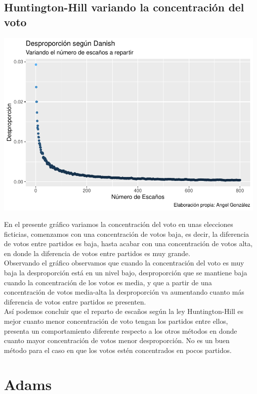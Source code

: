 \documentclass[12pt,a4paper,]{book}
\numberwithin{dummy}{section}
\theoremstyle{ocrenumbox}
\theoremstyle{blacknumex}
\theoremstyle{blacknumbox}
\theoremstyle{ocrenum}
\theoremstyle{ocrenum}
\begin{document}
\hypertarget{huntington-hill-variando-la-concentraciuxf3n-del-voto}{%
\subsection{Huntington-Hill variando la concentración del
voto}\label{huntington-hill-variando-la-concentraciuxf3n-del-voto}}

\begin{center}\includegraphics[width=0.95\linewidth]{figurasR/unnamed-chunk-35-1} \end{center}

En el presente gráfico variamos la concentración del voto en unas
elecciones ficticias, comenzamos con una concentración de votos baja, es
decir, la diferencia de votos entre partidos es baja, hasta acabar con
una concentración de votos alta, en donde la diferencia de votos entre
partidos es muy grande.\\
Observando el gráfico observamos que cuando la concentración del voto es
muy baja la desproporción está en un nivel bajo, desproporción que se
mantiene baja cuando la concentración de los votos es media, y que a
partir de una concentración de votos media-alta la desproporción va
aumentando cuanto más diferencia de votos entre partidos se presenten.\\
Así podemos concluir que el reparto de escaños según la ley
Huntington-Hill es mejor cuanto menor concentración de voto tengan los
partidos entre ellos, presenta un comportamiento diferente respecto a
los otros métodos en donde cuanto mayor concentración de votos menor
desproporción. No es un buen método para el caso en que los votos estén
concentrados en pocos partidos.

\hypertarget{adams}{%
\section{Adams}\label{adams}}
\end{document}
